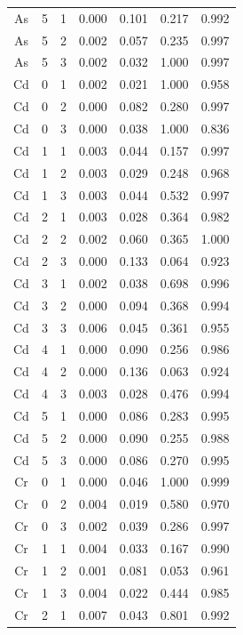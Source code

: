 \documentclass[ms, hidelinks]{uncgdissertationexp3}
\theoremstyle{plain}
\theoremstyle{definition}
\theoremstyle{remark}
\begin{document}
\begin{longtable}{ccccccc}
  As & 5 & 1 & 0.000 & 0.101 & 0.217 & 0.992\\
  \rowcolor{gray!6}  As & 5 & 2 & 0.002 & 0.057 & 0.235 & 0.997\\
  As & 5 & 3 & 0.002 & 0.032 & 1.000 & 0.997\\
  \rowcolor{gray!6}  Cd & 0 & 1 & 0.002 & 0.021 & 1.000 & 0.958\\
  Cd & 0 & 2 & 0.000 & 0.082 & 0.280 & 0.997\\
  \rowcolor{gray!6}  Cd & 0 & 3 & 0.000 & 0.038 & 1.000 & 0.836\\
  Cd & 1 & 1 & 0.003 & 0.044 & 0.157 & 0.997\\
  \rowcolor{gray!6}  Cd & 1 & 2 & 0.003 & 0.029 & 0.248 & 0.968\\
  Cd & 1 & 3 & 0.003 & 0.044 & 0.532 & 0.997\\
  \rowcolor{gray!6}  Cd & 2 & 1 & 0.003 & 0.028 & 0.364 & 0.982\\
  Cd & 2 & 2 & 0.002 & 0.060 & 0.365 & 1.000\\
  \rowcolor{gray!6}  Cd & 2 & 3 & 0.000 & 0.133 & 0.064 & 0.923\\
  Cd & 3 & 1 & 0.002 & 0.038 & 0.698 & 0.996\\
  \rowcolor{gray!6}  Cd & 3 & 2 & 0.000 & 0.094 & 0.368 & 0.994\\
  Cd & 3 & 3 & 0.006 & 0.045 & 0.361 & 0.955\\
  \rowcolor{gray!6}  Cd & 4 & 1 & 0.000 & 0.090 & 0.256 & 0.986\\
  Cd & 4 & 2 & 0.000 & 0.136 & 0.063 & 0.924\\
  \rowcolor{gray!6}  Cd & 4 & 3 & 0.003 & 0.028 & 0.476 & 0.994\\
  Cd & 5 & 1 & 0.000 & 0.086 & 0.283 & 0.995\\
  \rowcolor{gray!6}  Cd & 5 & 2 & 0.000 & 0.090 & 0.255 & 0.988\\
  Cd & 5 & 3 & 0.000 & 0.086 & 0.270 & 0.995\\
  \rowcolor{gray!6}  Cr & 0 & 1 & 0.000 & 0.046 & 1.000 & 0.999\\
  Cr & 0 & 2 & 0.004 & 0.019 & 0.580 & 0.970\\
  \rowcolor{gray!6}  Cr & 0 & 3 & 0.002 & 0.039 & 0.286 & 0.997\\
  Cr & 1 & 1 & 0.004 & 0.033 & 0.167 & 0.990\\
  \rowcolor{gray!6}  Cr & 1 & 2 & 0.001 & 0.081 & 0.053 & 0.961\\
  Cr & 1 & 3 & 0.004 & 0.022 & 0.444 & 0.985\\
  \rowcolor{gray!6}  Cr & 2 & 1 & 0.007 & 0.043 & 0.801 & 0.992\\

\end{longtable}
\end{document}
